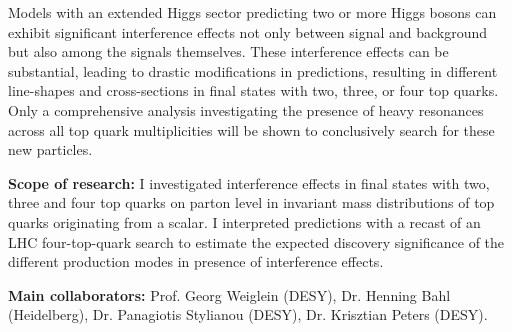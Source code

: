 \begin{cventries}
{\begin{cvitems}
        \item {Models with an extended Higgs sector predicting two or more Higgs bosons can exhibit significant interference effects not only between signal and background but also among the signals themselves.
        These interference effects can be substantial, leading to drastic modifications in predictions,
        resulting in different line-shapes and cross-sections in final states with two, three, or four top quarks. Only a comprehensive analysis investigating the presence of heavy resonances across all top quark multiplicities will be shown to conclusively search for these new particles.}
        \item \textbf{Scope of research:} I investigated interference effects in final states with two, three and four top quarks on parton level in invariant mass distributions of top quarks originating from a scalar. I interpreted predictions with a recast of an LHC four-top-quark search to estimate the expected discovery significance of the different production modes in presence of interference effects.
        \item \textbf{Main collaborators:} Prof. Georg Weiglein (DESY), Dr. Henning Bahl (Heidelberg),
        Dr. Panagiotis Stylianou (DESY), Dr. Krisztian Peters (DESY).
      \end{cvitems}
    }


\end{cventries}
